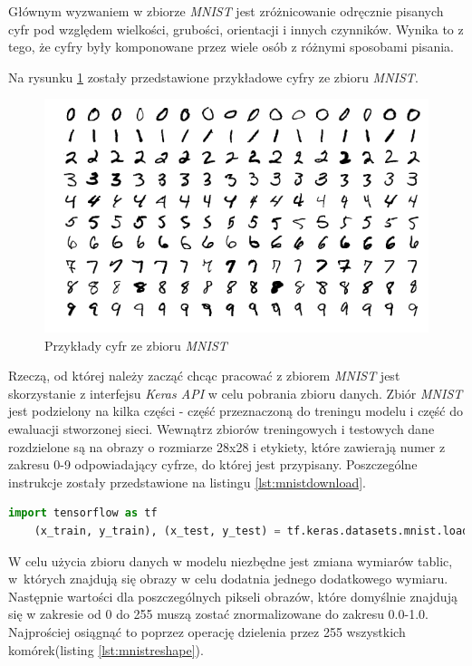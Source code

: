 \documentclass[a4paper,12pt,oneside]{book} %
\begin{document}
Głównym wyzwaniem w zbiorze \emph{MNIST} jest zróżnicowanie odręcznie pisanych cyfr pod względem wielkości, grubości, orientacji i innych czynników. Wynika to z tego, że cyfry były komponowane przez wiele osób z różnymi sposobami pisania\cite{9388351}.

Na rysunku \ref{mnistimg} zostały przedstawione przykładowe cyfry ze zbioru \emph{MNIST}.

\begin{figure}[h]
	\centering
	\includegraphics[scale=0.6]{mnistimg.png}
	\caption{Przykłady cyfr ze zbioru \emph{MNIST}\cite{mnistwik}}
	\label{mnistimg}
\end{figure}

Rzeczą, od której należy zacząć chcąc pracować z zbiorem \emph{MNIST} jest skorzystanie z interfejsu \emph{Keras API} w celu pobrania zbioru danych. Zbiór \emph{MNIST} jest podzielony na kilka części - część przeznaczoną do treningu modelu i część do ewaluacji stworzonej sieci. Wewnątrz zbiorów treningowych i testowych dane rozdzielone są na obrazy o rozmiarze 28x28 i etykiety, które zawierają numer z zakresu 0-9 odpowiadający cyfrze, do której jest przypisany\cite{mnistapp}. Poszczególne instrukcje zostały przedstawione na listingu \ref{lst:mnistdownload}.

\begin{lstlisting}[language=Python, caption={Pobieranie zbioru \emph{MNIST}\cite{mnistapp}}, label={lst:mnistdownload}]
	import tensorflow as tf
	(x_train, y_train), (x_test, y_test) = tf.keras.datasets.mnist.load_data()
\end{lstlisting}

W celu użycia zbioru danych w modelu niezbędne jest zmiana wymiarów tablic, w~których znajdują się obrazy w celu dodatnia jednego dodatkowego wymiaru. Następnie wartości dla poszczególnych pikseli obrazów, które domyślnie znajdują się w zakresie od 0 do 255 muszą zostać znormalizowane do zakresu 0.0-1.0. Najprościej osiągnąć to poprzez operację dzielenia przez 255 wszystkich komórek(listing \ref{lst:mnistreshape})\cite{mnistapp}.
\end{document}
